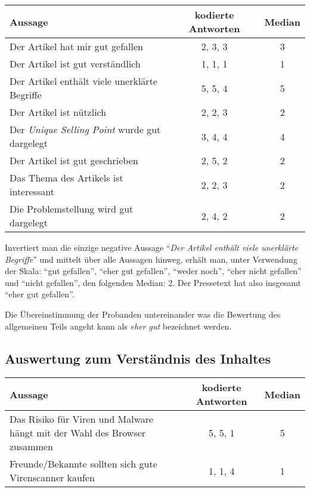 \begin{table}[!ht]
    \begin{center}
        \begin{tabular}{lcc}
        \toprule
        \textbf{Aussage} & \textbf{kodierte Antworten} & \textbf{Median} \\
        \midrule
        Der Artikel hat mir gut gefallen & 2, 3, 3 & 3 \\
        Der Artikel ist gut verständlich & 1, 1, 1 & 1 \\
        Der Artikel enthält viele unerklärte Begriffe & 5, 5, 4 & 5 \\
        Der Artikel ist nützlich & 2, 2, 3 & 2 \\
        Der \emph{Unique Selling Point} wurde gut dargelegt & 3, 4, 4 & 4 \\
        Der Artikel ist gut geschrieben & 2, 5, 2 & 2 \\
        Das Thema des Artikels ist interessant & 2, 2, 3 & 2 \\
        Die Problemstellung wird gut dargelegt & 2, 4, 2 & 2 \\
        \bottomrule
        \end{tabular}
    \end{center}
\end{table}

Invertiert man die einzige negative Aussage \enquote{\emph{Der Artikel enthält
viele unerklärte Begriffe}} und mittelt über alle Aussagen hinweg, erhält man,
unter Verwendung der Skala: \enquote{gut gefallen}, \enquote{eher gut
gefallen}, \enquote{weder noch}, \enquote{eher nicht gefallen} und
\enquote{nicht gefallen}, den folgenden Median: 2.
Der Pressetext hat also insgesamt \enquote{eher gut gefallen}.

Die Übereinstimmung der Probanden untereinander was die Bewertung des
allgemeinen Teils angeht kann als \emph{eher gut} bezeichnet werden.


\subsection{Auswertung zum Verständnis des Inhaltes}

\begin{table}[!ht]
    \begin{center}
        \begin{tabular}{p{8cm}cc}
        \toprule
        \textbf{Aussage} & \textbf{kodierte Antworten} & \textbf{Median} \\
        \midrule
        Das Risiko für Viren und Malware hängt mit der Wahl des Browser zusammen & 5, 5, 1 & 5 \\
        \addlinespace
        Freunde/Bekannte sollten sich gute Virenscanner kaufen & 1, 1, 4 & 1 \\
        \bottomrule
        \end{tabular}
    \end{center}
\end{table}

